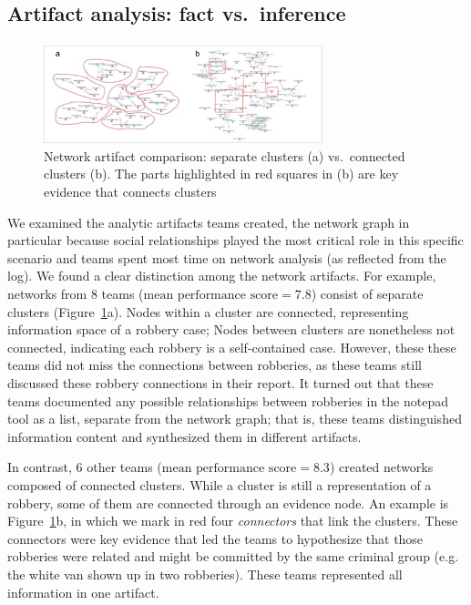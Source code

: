 \subsection{Artifact analysis: fact
vs.~inference}\label{artifact-construction-fact-vs.inference}

\begin{figure}
\centering
\includegraphics[width=3.20000in]{img/network_cluster.png}
\caption{Network artifact comparison: separate clusters (a)
vs.~connected clusters (b). The parts highlighted in red squares in (b) are key
evidence that connects clusters\label{fig:network_cluster}}
\end{figure}

We examined the analytic artifacts teams created, the network
graph in particular because social relationships played the most
critical role in this specific scenario and teams spent most time on
network analysis (as reflected from the log). We found a clear distinction among the network artifacts. For example, networks from
8 teams ($\text{mean performance score}=7.8$) consist of separate clusters
(Figure~\ref{fig:network_cluster}a). Nodes within a cluster are
connected, representing information space of a robbery case; Nodes
between clusters are nonetheless not connected, indicating each robbery
is a self-contained case. However, these these teams did not miss the connections between robberies, as these teams still discussed these robbery connections in their report. 
It turned out that these teams documented any possible relationships between
robberies in the notepad tool as a list, separate from the network graph; that is, these teams distinguished information content and synthesized them in different artifacts.

In contrast, 6 other teams ($\text{mean performance score}=8.3$) created networks
composed of connected clusters. While a cluster is still a
representation of a robbery, some of them are connected through an
evidence node. An example is Figure~\ref{fig:network_cluster}b, in
which we mark in red four \emph{connectors} that link the clusters. These
connectors were key evidence that led the teams to hypothesize that
those robberies were related and might be committed by the same criminal
group (e.g. the white van shown up in two robberies). These teams represented all information in one artifact.

